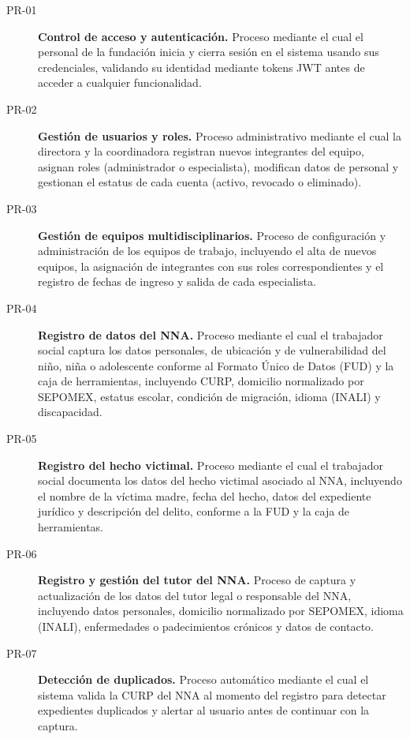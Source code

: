 \begin{description}
	\item[PR-01] \textbf{Control de acceso y autenticación.} Proceso mediante 
	el cual el personal de la fundación inicia y cierra sesión en el sistema 
	usando sus credenciales, validando su identidad mediante tokens JWT antes 
	de acceder a cualquier funcionalidad.
	
	\item[PR-02] \textbf{Gestión de usuarios y roles.} Proceso administrativo 
	mediante el cual la directora y la coordinadora registran nuevos integrantes 
	del equipo, asignan roles (administrador o especialista), modifican datos 
	de personal y gestionan el estatus de cada cuenta (activo, revocado 
	o eliminado).
	
	\item[PR-03] \textbf{Gestión de equipos multidisciplinarios.} Proceso de 
	configuración y administración de los equipos de trabajo, incluyendo el 
	alta de nuevos equipos, la asignación de integrantes con sus roles 
	correspondientes y el registro de fechas de ingreso y salida de cada 
	especialista.
	
	\item[PR-04] \textbf{Registro de datos del NNA.} Proceso mediante el cual 
	el trabajador social captura los datos personales, de ubicación y de 
	vulnerabilidad del niño, niña o adolescente conforme al Formato Único 
	de Datos (FUD) y la caja de herramientas, incluyendo CURP, domicilio 
	normalizado por SEPOMEX, estatus escolar, condición de migración, 
	idioma (INALI) y discapacidad.
	
	\item[PR-05] \textbf{Registro del hecho victimal.} Proceso mediante el 
	cual el trabajador social documenta los datos del hecho victimal asociado 
	al NNA, incluyendo el nombre de la víctima madre, fecha del hecho, datos 
	del expediente jurídico y descripción del delito, conforme a la FUD y 
	la caja de herramientas.
	
	\item[PR-06] \textbf{Registro y gestión del tutor del NNA.} Proceso de 
	captura y actualización de los datos del tutor legal o responsable del 
	NNA, incluyendo datos personales, domicilio normalizado por SEPOMEX, 
	idioma (INALI), enfermedades o padecimientos crónicos y datos de contacto.
	
	\item[PR-07] \textbf{Detección de duplicados.} Proceso automático mediante 
	el cual el sistema valida la CURP del NNA al momento del registro para 
	detectar expedientes duplicados y alertar al usuario antes de continuar 
	con la captura.
	

\end{description}
